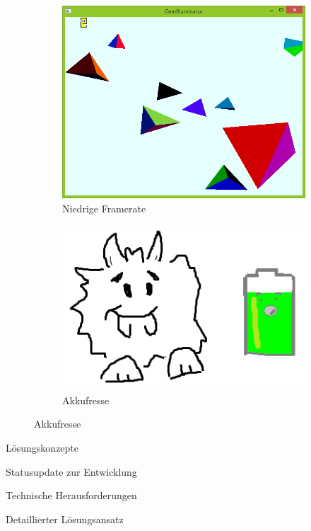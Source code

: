 {
	\begin{figure}
		\centering
		\begin{subfigure}{\textwidth}
			\centering
			\includegraphics[width=\textwidth, height=0.3\textheight, keepaspectratio]{images/lowFPS}
			\caption{Niedrige Framerate}
		\end{subfigure}
		\begin{subfigure}{\textwidth}
			\centering
			\includegraphics[width=\textwidth, height=0.3\textheight, keepaspectratio]{images/akkufresser}
			\caption{Akkufresse}
		\end{subfigure}
	\end{figure}
}


\begin{frame}{Lösungskonzepte}

\end{frame}

\begin{frame}{Statusupdate zur Entwicklung}

\end{frame}

\begin{frame}{Technische Herausforderungen}

\end{frame}

\begin{frame}{Detaillierter Lösungsansatz}

\end{frame}

%

